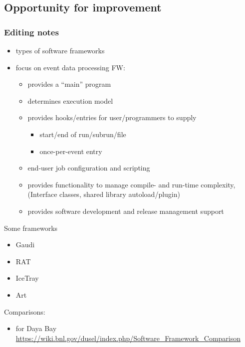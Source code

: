 \subsection{Opportunity for improvement}



\subsubsection{Editing notes}




\begin{itemize}
\item types of software frameworks
\item focus on event data processing FW:
  \begin{itemize}
  \item provides a ``main'' program
  \item determines execution model
  \item provides hooks/entries for user/programmers to supply
    \begin{itemize}
    \item start/end of run/subrun/file
    \item once-per-event entry
    \end{itemize}
  \item end-user job configuration and scripting
  \item provides functionality to manage compile- and run-time complexity, (Interface classes, shared library autoload/plugin)
  \item provides software development and release management support
  \end{itemize}
\end{itemize}
Some frameworks
\begin{itemize}
\item Gaudi
\item RAT
\item IceTray
\item Art
\end{itemize}
Comparisons:
\begin{itemize}
\item for Daya Bay \url{https://wiki.bnl.gov/dusel/index.php/Software_Framework_Comparison}
\end{itemize}
